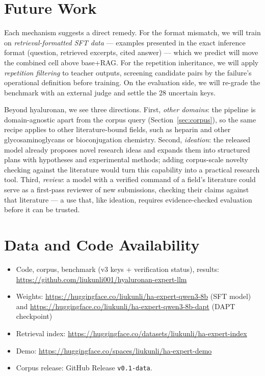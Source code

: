 \documentclass[11pt]{article}
\begin{document}
\section{Future Work}
\label{sec:future}

Each mechanism suggests a direct remedy. For the format mismatch, we
will train on \emph{retrieval-formatted SFT data} --- examples
presented in the exact inference format (question, retrieved excerpts,
cited answer) --- which we predict will move the combined cell above
base+RAG. For the repetition inheritance, we will apply
\emph{repetition filtering} to teacher outputs, screening candidate
pairs by the failure's operational definition before training. On the
evaluation side, we will re-grade the benchmark with an external judge
and settle the 28 uncertain keys.

Beyond hyaluronan, we see three directions. First, \emph{other
domains}: the pipeline is domain-agnostic apart from the corpus query
(Section~\ref{sec:corpus}), so the same recipe applies to other
literature-bound fields, such as heparin and other glycosaminoglycans
or bioconjugation chemistry. Second, \emph{ideation}: the released
model already proposes novel research ideas and expands them into
structured plans with hypotheses and experimental methods; adding
corpus-scale novelty checking against the literature would turn this
capability into a practical research tool. Third, \emph{review}: a
model with a verified command of a field's literature could serve as a
first-pass reviewer of new submissions, checking their claims against
that literature --- a use that, like ideation, requires
evidence-checked evaluation before it can be trusted.

\section{Data and Code Availability}
\label{sec:availability}

\begin{itemize}
\item Code, corpus, benchmark (v3 keys + verification status), results:
\url{https://github.com/liukunli001/hyaluronan-expert-llm}
\item Weights: \url{https://huggingface.co/liukunli/ha-expert-qwen3-8b}
(SFT model) and
\url{https://huggingface.co/liukunli/ha-expert-qwen3-8b-dapt} (DAPT
checkpoint)
\item Retrieval index:
\url{https://huggingface.co/datasets/liukunli/ha-expert-index}
\item Demo: \url{https://huggingface.co/spaces/liukunli/ha-expert-demo}
\item Corpus release: GitHub Release \texttt{v0.1-data}.
\end{itemize}
\end{document}
